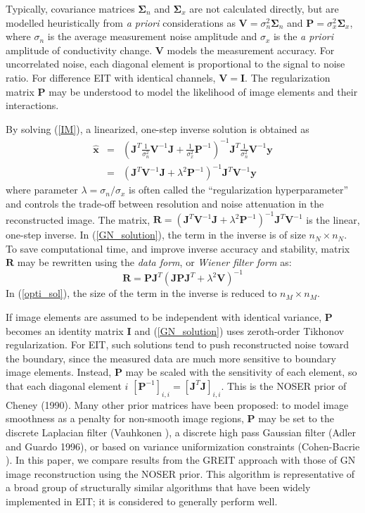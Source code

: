 \documentclass[12pt]{iopart}
\newcommand{\xH}{\mbox{$\mathbf{\hat x}$}}
\newcommand{\yB}{\mbox{$\mathbf{y}$}}
\newcommand{\RB}{\mbox{$\mathbf{R}$}}
\newcommand{\IB}{\mbox{$\mathbf{I}$}}
\newcommand{\JB}{\mbox{$\mathbf{J}$}}
\renewcommand{\PB}{\mbox{$\mathbf{P}$}}
\newcommand{\VB}{\mbox{$\mathbf{V}$}}
\newcommand{\SG}{\mbox{${\boldsymbol \Sigma}$}}
\begin{document}
Typically,  covariance matrices
$\SG_n$ and $\SG_x$ are not calculated directly, but
are modelled heuristically from {\em a priori}
considerations as 
 $\VB = \sigma_n^{2}\SG_n$
 and
 $\PB = \sigma_x^{2}\SG_x$,
where $\sigma_n$ is the average measurement noise amplitude and
$\sigma_x$ is the {\em a priori} amplitude of conductivity change.
$\VB$ models the measurement accuracy. For uncorrelated noise,
each diagonal element is proportional to the signal to noise
ratio. For difference EIT with identical channels, $\VB=\IB$. The
regularization matrix $\PB$ may be understood to model the
likelihood of image elements and their interactions.

By solving (\ref{IM}), a linearized, one-step inverse solution is
obtained as
\begin{eqnarray}\label{GN_solution}
\xH&=&\left(
    \JB^T \frac{1}{\sigma_n^2} \VB^{-1} \JB 
     +
    \frac{1}{\sigma_x^2} \PB^{-1}
    \right)^{-1}
    \JB^T \frac{1}{\sigma_n^2}\VB^{-1}\yB
\nonumber \\
   &=&\left(
    \JB^T \VB^{-1} \JB + \lambda^2 \PB^{-1}
    \right)^{-1}
    \JB^T \VB^{-1} \yB
\end{eqnarray}
where parameter  $\lambda=\sigma_n/\sigma_x$ is
often called the ``regularization hyperparameter'' and
controls the trade-off
between resolution and noise attenuation in the reconstructed
image.
The matrix,
$\RB=\left(\JB^T\VB^{-1}\JB+\lambda^2\PB^{-1}\right)^{-1}\JB^T\VB^{-1}$
is the linear, one-step inverse.
In (\ref{GN_solution}), the term in the inverse is of size
$n_N\times n_N$. To save computational time, and improve inverse
accuracy and stability, matrix $\RB$ may be rewritten 
using the {\em data form}, or {\em Wiener filter form} as:
\begin{equation}\label{opti_sol}
 \RB =\PB\JB^T
    \left(
       \JB\PB\JB^T+\lambda^2\VB
   \right)^{-1}
\end{equation}
In (\ref{opti_sol}), the size of the term in the
inverse is reduced to $n_M\times n_M$.

If image elements are assumed to be independent with identical
variance, $\PB$ becomes an identity matrix $\IB$ and
(\ref{GN_solution}) uses zeroth-order Tikhonov regularization. For
EIT, such solutions tend to push reconstructed noise toward the
boundary, since the measured data are much more sensitive to
boundary image elements. Instead, $\PB$ may be scaled with the
sensitivity of each element, so that each diagonal element $i$ 
$[\PB^{-1}]_{i,i} = \left[ \JB^T \JB
\right]_{i,i}$. This is the NOSER prior of Cheney \etal (1990).
Many other prior matrices have been
proposed: to model image smoothness as a penalty for non-smooth
image regions, $\PB$ may be set to the discrete Laplacian filter
(Vauhkonen ), a discrete high pass Gaussian filter (Adler
and Guardo 1996), or based on variance uniformization
constraints (Cohen-Bacrie ).
In this paper, we compare results from the GREIT approach
with those of GN image reconstruction using the NOSER prior.
This algorithm is 
representative of a broad group of structurally similar 
algorithms that have been widely implemented in EIT;
it is considered to generally perform well.
\end{document}
